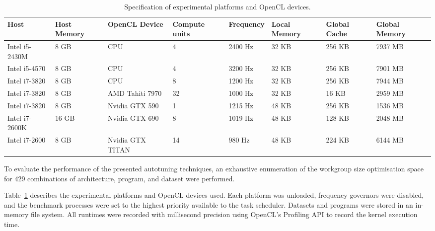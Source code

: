 \documentclass[nonatbib,preprint,10pt]{sigplanconf}
\begin{document}
\begin{table}
\scriptsize
\centering
\begin{tabular}{l l | l l l l l l}
\toprule
Host & Host Memory &  OpenCL Device &  Compute units & Frequency & Local Memory & Global Cache & Global Memory \\
\midrule
Intel i5-2430M & 8 GB  & CPU              &              4 &   2400 Hz &        32 KB &       256 KB &       7937 MB \\
Intel i5-4570  & 8 GB  & CPU              &              4 &   3200 Hz &        32 KB &       256 KB &       7901 MB \\
Intel i7-3820  & 8 GB  & CPU              &              8 &   1200 Hz &        32 KB &       256 KB &       7944 MB \\
Intel i7-3820  & 8 GB  & AMD Tahiti 7970  &             32 &   1000 Hz &        32 KB &        16 KB &       2959 MB \\
Intel i7-3820  & 8 GB  & Nvidia GTX 590   &              1 &   1215 Hz &        48 KB &       256 KB &       1536 MB \\
Intel i7-2600K & 16 GB & Nvidia GTX 690   &              8 &   1019 Hz &        48 KB &       128 KB &       2048 MB \\
Intel i7-2600  & 8 GB  & Nvidia GTX TITAN &             14 &    980 Hz &        48 KB &       224 KB &       6144 MB \\
\bottomrule
\end{tabular}
\caption{Specification of experimental platforms and OpenCL devices.}
\label{tab:hw}
\end{table}

To evaluate the performance of the presented autotuning techniques, an
exhaustive enumeration of the workgroup size optimisation space for
429 combinations of architecture, program, and dataset were performed.

Table~\ref{tab:hw} describes the experimental platforms and OpenCL
devices used. Each platform was unloaded, frequency governors were
disabled, and the benchmark processes were set to the highest priority
available to the task scheduler. Datasets and programs were stored in
an in-memory file system. All runtimes were recorded with millisecond
precision using OpenCL's Profiling API to record the kernel execution
time.
\end{document}
